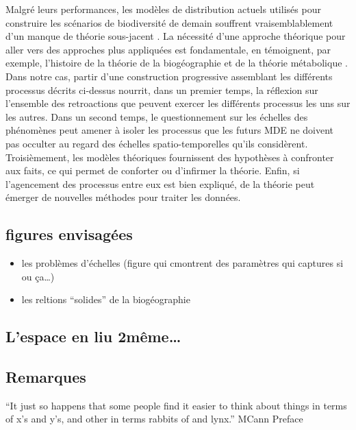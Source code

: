 Malgré leurs performances, les modèles de distribution actuels utilisés
pour construire les scénarios de biodiversité de demain souffrent
vraisemblablement d'un manque de théorie sous-jacent
\cite{Beck2012,Lomolino2000}. La nécessité d'une approche théorique pour
aller vers des approches plus appliquées est fondamentale, en
témoignent, par exemple, l'histoire de la théorie de la biogéographie
\cite{MacArthur1967} et de la théorie métabolique \cite{Brown2004}. Dans
notre cas, partir d'une construction progressive assemblant les
différents processus décrits ci-dessus nourrit, dans un premier temps,
la réflexion sur l'ensemble des retroactions que peuvent exercer les
différents processus les uns sur les autres\cite{Thuiller2013}. Dans un
second temps, le questionnement sur les échelles des phénomènes peut
amener à isoler les processus que les futurs MDE ne doivent pas occulter
au regard des échelles spatio-temporelles qu'ils considèrent.
Troisièmement, les modèles théoriques fournissent des hypothèses à
confronter aux faits, ce qui permet de conforter ou d'infirmer la
théorie. Enfin, si l'agencement des processus entre eux est bien
expliqué, de la théorie peut émerger de nouvelles méthodes pour traiter
les données.

\subsection{figures envisagées}\label{figures-envisaguxe9es}

\begin{itemize}
\tightlist
\item
  les problèmes d'échelles (figure qui cmontrent des paramètres qui
  captures si ou ça\ldots{})
\item
  les reltions ``solides'' de la biogéographie
\end{itemize}

\subsection{L'espace en liu
2même\ldots{}}\label{lespace-en-liu-2muxeame}

\subsection{Remarques}\label{remarques}

``It just so happens that some people find it easier to think about
things in terms of x's and y's, and other in terms rabbits of and
lynx.'' MCann Preface

